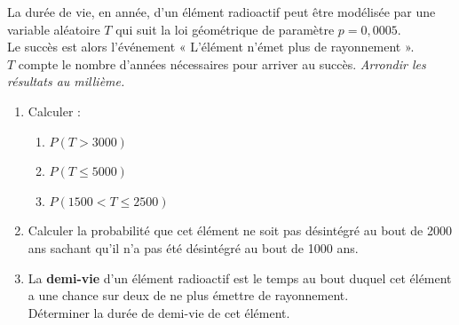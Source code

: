 \documentclass[a4paper,11pt,exos]{nsi} %
\begin{document}
\exo{}
\textcolor{UGLiBlue}{La durée de vie, en année, d'un élément radioactif peut être modélisée par une variable aléatoire $T$ qui suit la loi géométrique de paramètre $p=0,000 5$.\\
Le succès est alors l'événement « L'élément n'émet plus de rayonnement ».\\
$T$ compte le nombre d'années nécessaires pour arriver au succès. \textit{Arrondir les résultats au millième.}
\begin{enumerate}
    \item Calculer :
    \begin{multicols}{3}
        \begin{enumerate}[label=\textbullet]
            \item $P(T>3000)$
            \item $P(T\leqslant 5000)$
            \item $P(1500<T\leqslant 2500)$
        \end{enumerate}
    \end{multicols}
    \item Calculer la probabilité que cet élément ne soit pas désintégré au bout de 2000 ans sachant qu'il n'a pas été désintégré au bout de 1000 ans.
    \item La \textbf{demi-vie} d'un élément radioactif est le temps au bout duquel cet élément a une chance sur deux de ne plus émettre de rayonnement.\\
    \faCalculator \hspace*{.2cm} Déterminer la durée de demi-vie de cet élément.
\end{enumerate}}
\end{document}
